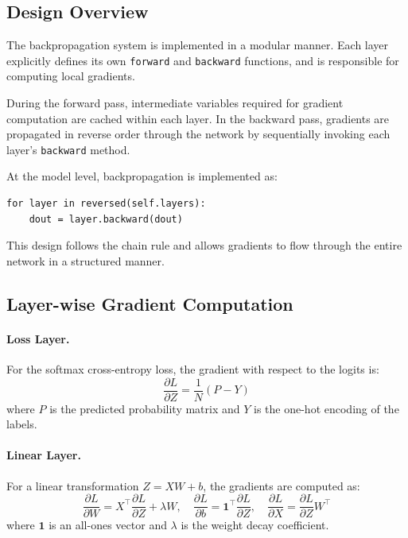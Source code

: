\documentclass[11pt]{article}
\begin{document}
\subsection{Design Overview}

The backpropagation system is implemented in a modular manner. Each layer explicitly defines its own \texttt{forward} and \texttt{backward} functions, and is responsible for computing local gradients.

During the forward pass, intermediate variables required for gradient computation are cached within each layer. In the backward pass, gradients are propagated in reverse order through the network by sequentially invoking each layer's \texttt{backward} method.

At the model level, backpropagation is implemented as:
\begin{verbatim}
for layer in reversed(self.layers):
    dout = layer.backward(dout)
\end{verbatim}

This design follows the chain rule and allows gradients to flow through the entire network in a structured manner.

\subsection{Layer-wise Gradient Computation}

\paragraph{Loss Layer.}
For the softmax cross-entropy loss, the gradient with respect to the logits is:
\[
\frac{\partial L}{\partial Z} = \frac{1}{N} (P - Y)
\]
where $P$ is the predicted probability matrix and $Y$ is the one-hot encoding of the labels.

\paragraph{Linear Layer.}
For a linear transformation $Z = XW + b$, the gradients are computed as:
\[
\frac{\partial L}{\partial W} = X^\top \frac{\partial L}{\partial Z} + \lambda W, \quad
\frac{\partial L}{\partial b} = \mathbf{1}^\top \frac{\partial L}{\partial Z}, \quad
\frac{\partial L}{\partial X} = \frac{\partial L}{\partial Z} W^\top
\]
where $\mathbf{1}$ is an all-ones vector and $\lambda$ is the weight decay coefficient.
\end{document}
